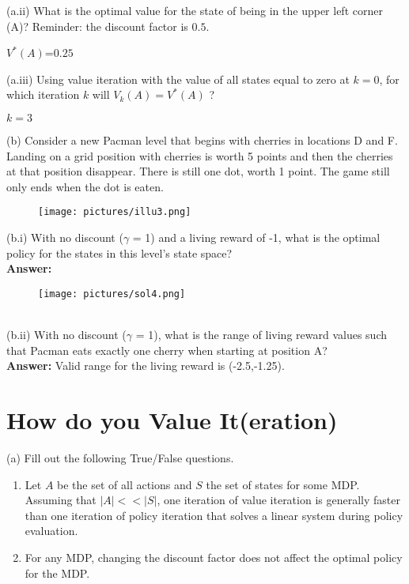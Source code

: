 \documentclass{article}
\begin{document}
\noindent (a.ii) What is the optimal value for the state of being in the upper left corner (A)? Reminder: the discount factor is $0.5$.

$V^*(A)$=$0.25$

\noindent (a.iii) Using value iteration with the value of all states equal to zero at $k=0$, for which iteration $k$ will $V_k(A) = V^*(A)$ ? 

$k=3$


\newpage
\noindent (b) Consider a new Pacman level that begins with cherries in locations D and F. Landing on a grid position with cherries is worth 5 points and then the cherries at that position disappear. There is still one dot, worth 1 point. The game still only ends when the dot is eaten.

\begin{figure}[h]
\centering
\texttt{[image: pictures/illu3.png]}
\end{figure}

\noindent (b.i) With no discount ($\gamma$ = 1) and a living reward of -1, what is the optimal policy for the states in this level's state space? \\

\textbf{Answer:}

\begin{figure}[h]
\centering
\texttt{[image: pictures/sol4.png]}
\end{figure}

~\\
\noindent (b.ii) With no discount ($\gamma$ = 1), what is the range of living reward values such that Pacman eats exactly one cherry when starting at position A? \\

\textbf{Answer:} Valid range for the living reward is (-2.5,-1.25).

\newpage

\section{How do you Value It(eration)}
\noindent (a) Fill out the following True/False questions.

\begin{enumerate}
  \item Let $A$ be the set of all actions and $S$ the set of states for some MDP. Assuming that $|A| << |S|$, one iteration of value iteration is generally faster than one iteration of policy iteration that solves a linear system during policy evaluation.
  \item For any MDP, changing the discount factor does not affect the optimal policy for the MDP.
\end{enumerate}
\end{document}
